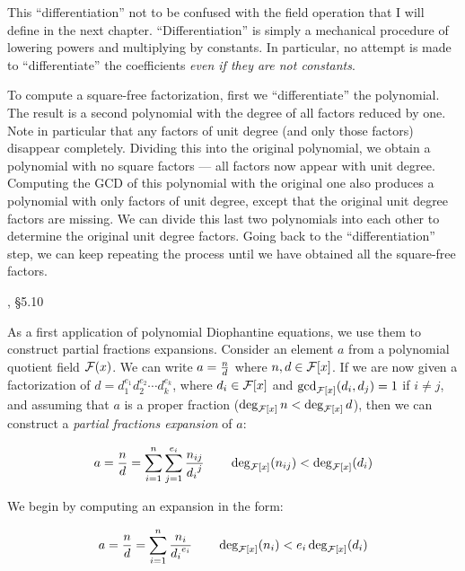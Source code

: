 This ``differentiation'' not to be confused with the field operation
that I will define in the next chapter.  ``Differentiation'' is simply
a mechanical procedure of lowering powers and multiplying by
constants.  In particular, no attempt is made to ``differentiate''
the coefficients {\it even if they are not constants}.

To compute a square-free factorization, first we ``differentiate'' the
polynomial.  The result is a second polynomial with the degree of all
factors reduced by one.  Note in particular that any factors of unit
degree (and only those factors) disappear completely.  Dividing this
into the original polynomial, we obtain a polynomial with no square
factors --- all factors now appear with unit degree.  Computing the
GCD of this polynomial with the original one also produces a
polynomial with only factors of unit degree, except that the original
unit degree factors are missing.  We can divide this last two
polynomials into each other to determine the original unit degree
factors.  Going back to the ``differentiation'' step, we can keep
repeating the process until we have obtained all the square-free
factors.

\vfill\eject

, \S5.10

As a first application of polynomial Diophantine equations, we use
them to construct partial fractions expansions.  Consider an element
$a$ from a polynomial quotient field ${\cal F}(x)$.  We can write
$a={n\over d}$ where $n,d\in{\cal F}[x]$.  If we are now given a
factorization of $d=d_1^{e_1} d_2^{e_2} \cdots d_k^{e_k}$, where
$d_i\in {\cal F}[x]$ and $\gcd_{{\cal F}[x]}(d_i,d_j)=1$ if $i\ne j$,
and assuming that $a$ is a proper fraction
($\deg_{{\cal F}[x]}n < \deg_{{\cal F}[x]}d$),
then we can construct a {\it partial fractions expansion} of $a$:

\begin{displaymath}
a={n\over d}=\sum_{i=1}^{n}\sum_{j=1}^{e_i} {n_{ij}\over {d_i}^j}
\qquad \deg_{{\cal F}[x]}(n_{ij}) < \deg_{{\cal F}[x]}(d_i)
\end{displaymath}

We begin by computing an expansion in the form:

\begin{displaymath}
a={n\over d}=\sum_{i=1}^{n} {n_i\over {d_i}^{e_i}}
\qquad \deg_{{\cal F}[x]}(n_i) < e_i\deg_{{\cal F}[x]}(d_i)
\end{displaymath}

